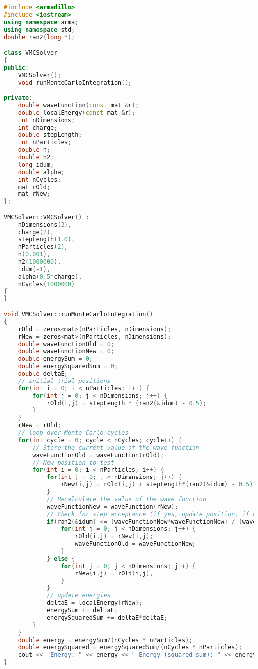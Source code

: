 \documentclass[graybox,sectrefs,envcountresetchap,open=right]{svmonodo}
\begin{document}
\begin{lstlisting}[language=C++,style=blue1]
#include <armadillo>
#include <iostream>
using namespace arma;
using namespace std;
double ran2(long *);

class VMCSolver
{
public:
    VMCSolver();
    void runMonteCarloIntegration();

private:
    double waveFunction(const mat &r);
    double localEnergy(const mat &r);
    int nDimensions;
    int charge;
    double stepLength;
    int nParticles;
    double h;
    double h2;
    long idum;
    double alpha;
    int nCycles;
    mat rOld;
    mat rNew;
};

VMCSolver::VMCSolver() :
    nDimensions(3),
    charge(2),
    stepLength(1.0),
    nParticles(2),
    h(0.001),
    h2(1000000),
    idum(-1),
    alpha(0.5*charge),
    nCycles(1000000)
{
}

void VMCSolver::runMonteCarloIntegration()
{
    rOld = zeros<mat>(nParticles, nDimensions);
    rNew = zeros<mat>(nParticles, nDimensions);
    double waveFunctionOld = 0;
    double waveFunctionNew = 0;
    double energySum = 0;
    double energySquaredSum = 0;
    double deltaE;
    // initial trial positions
    for(int i = 0; i < nParticles; i++) {
        for(int j = 0; j < nDimensions; j++) {
            rOld(i,j) = stepLength * (ran2(&idum) - 0.5);
        }
    }
    rNew = rOld;
    // loop over Monte Carlo cycles
    for(int cycle = 0; cycle < nCycles; cycle++) {
        // Store the current value of the wave function
        waveFunctionOld = waveFunction(rOld);
        // New position to test
        for(int i = 0; i < nParticles; i++) {
            for(int j = 0; j < nDimensions; j++) {
                rNew(i,j) = rOld(i,j) + stepLength*(ran2(&idum) - 0.5);
            }
            // Recalculate the value of the wave function
            waveFunctionNew = waveFunction(rNew);
            // Check for step acceptance (if yes, update position, if no, reset position)
            if(ran2(&idum) <= (waveFunctionNew*waveFunctionNew) / (waveFunctionOld*waveFunctionOld)) {
                for(int j = 0; j < nDimensions; j++) {
                    rOld(i,j) = rNew(i,j);
                    waveFunctionOld = waveFunctionNew;
                }
            } else {
                for(int j = 0; j < nDimensions; j++) {
                    rNew(i,j) = rOld(i,j);
                }
            }
            // update energies
            deltaE = localEnergy(rNew);
            energySum += deltaE;
            energySquaredSum += deltaE*deltaE;
        }
    }
    double energy = energySum/(nCycles * nParticles);
    double energySquared = energySquaredSum/(nCycles * nParticles);
    cout << "Energy: " << energy << " Energy (squared sum): " << energySquared << endl;
}


\end{lstlisting}
\end{document}
